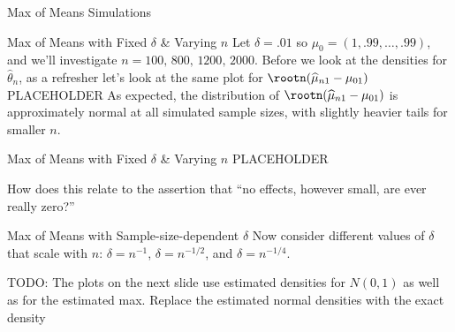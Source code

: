 \documentclass[aspectratio=169, professionalfonts, handout]{beamer}
\begin{document}
\begin{frame}{Max of Means Simulations}


\end{frame}

\begin{frame}{Max of Means with Fixed $\delta$ \& Varying $n$}
	Let $\delta = .01$ so $\mu_0 = (1, .99, \ldots, .99)$, and we'll investigate
	$n = 100, \, 800, \, 1200, \, 2000$. Before we look at the densities for
	$\widehat{\theta}_n$, as a refresher let's look at the same plot for $\rootn(\widehat{\mu}_{n1}
		- \mu_{01})$
	\vfill
	PLACEHOLDER
	\vfill \pause
	As expected, the distribution of $\rootn(\widehat{\mu}_{n1} - \mu_{01})$ is
	approximately normal at all simulated sample sizes, with slightly heavier tails for smaller $n$.

\end{frame}

\begin{frame}{Max of Means with Fixed $\delta$ \& Varying $n$}
	PLACEHOLDER

	How does this relate to the assertion that ``no effects,
	however small, are ever really zero?''


\end{frame}

\begin{frame}{Max of Means with Sample-size-dependent $\delta$}
	Now consider different values of $\delta$ that scale with $n$: $\delta = n^{-1}$,
	$\delta = n^{-1/2}$, and $\delta = n^{-1/4}$.

	\vfill
	TODO: The plots on the next slide use estimated densities for $N(0,1)$
	as well as for the estimated max. Replace the estimated normal densities with
	the exact density
\end{frame}
\end{document}
